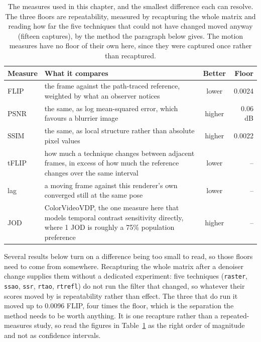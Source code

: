 \begin{table}[tbp]
\caption[The measures used in this chapter]{The measures used in this chapter, and the smallest
difference each can resolve. The three floors are repeatability, measured by recapturing the whole
matrix and reading how far the five techniques that could not have changed moved anyway
(fifteen captures), by the method the paragraph below gives. The motion measures have no floor of
their own here, since they were captured once rather than recaptured.}
\label{tab:metrics}
\centering
\small
\begin{tabularx}{\textwidth}{@{}l>{\raggedright\arraybackslash}X c r@{}}
\toprule
Measure & What it compares & Better & Floor \\
\midrule
FLIP  & the frame against the path-traced reference, weighted by what an observer notices & lower & 0.0024 \\
PSNR  & the same, as log mean-squared error, which favours a blurrier image & higher & 0.06 dB \\
SSIM  & the same, as local structure rather than absolute pixel values & higher & 0.0022 \\
\addlinespace[3pt]
tFLIP & how much a technique changes between adjacent frames, in excess of how much the reference changes over the same interval & lower & -- \\
lag   & a moving frame against this renderer's own converged still at the same pose & lower & -- \\
JOD   & ColorVideoVDP, the one measure here that models temporal contrast sensitivity directly, where 1 JOD is roughly a 75\% population preference & higher & -- \\
\bottomrule
\end{tabularx}
\end{table}

Several results below turn on a difference being too small to read, so those floors need to come from
somewhere. Recapturing the whole matrix after a denoiser change supplies them without a dedicated
experiment: five techniques (\texttt{raster}, \texttt{ssao}, \texttt{ssr}, \texttt{rtao},
\texttt{rtrefl}) do not run the filter that changed, so whatever their scores moved by is
repeatability rather than effect. The three that do run it moved up to 0.0096 FLIP, four times the
floor, which is the separation the method needs to be worth anything. It is one recapture rather than
a repeated-measures study, so read the figures in Table~\ref{tab:metrics} as the right order of
magnitude and not as confidence intervals.

